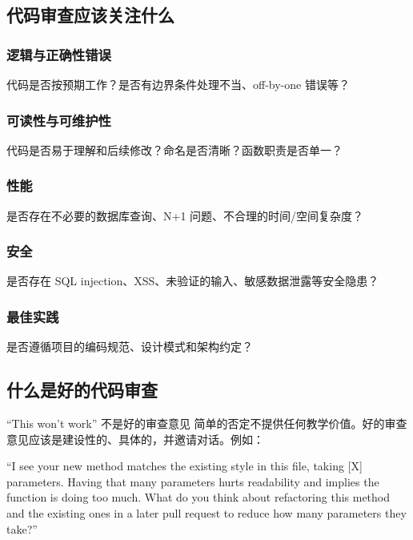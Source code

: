 \documentclass[a4paper]{article}
\begin{document}
\subsection{代码审查应该关注什么}

\subsubsection{逻辑与正确性错误}

代码是否按预期工作？是否有边界条件处理不当、off-by-one 错误等？

\subsubsection{可读性与可维护性}

代码是否易于理解和后续修改？命名是否清晰？函数职责是否单一？

\subsubsection{性能}

是否存在不必要的数据库查询、N+1 问题、不合理的时间/空间复杂度？

\subsubsection{安全}

是否存在 SQL injection、XSS、未验证的输入、敏感数据泄露等安全隐患？

\subsubsection{最佳实践}

是否遵循项目的编码规范、设计模式和架构约定？

\subsection{什么是好的代码审查}

\begin{warningbox}{``This won't work'' 不是好的审查意见}
简单的否定不提供任何教学价值。好的审查意见应该是建设性的、具体的，并邀请对话。例如：

``I see your new method matches the existing style in this file, taking {[}X{]} parameters. Having that many parameters hurts readability and implies the function is doing too much. What do you think about refactoring this method and the existing ones in a later pull request to reduce how many parameters they take?''
\end{warningbox}
\end{document}
